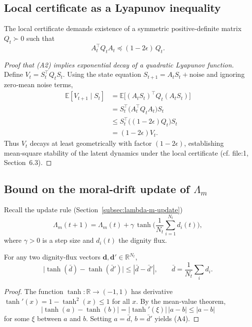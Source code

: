 \documentclass[11pt]{article}
\begin{document}
\subsection{Local certificate as a Lyapunov inequality}
The local certificate demands existence of a symmetric positive‑definite matrix $Q_t\succ0$ such that
\[
A_t^\top Q_t A_t \preceq (1-2\epsilon)\,Q_t .
\tag{A2}
\]

\begin{proof}[Proof that (A2) implies exponential decay of a quadratic Lyapunov function]
Define $V_t = S_t^\top Q_t S_t$. Using the state equation $S_{t+1}=A_t S_t+\text{noise}$ and ignoring zero‑mean noise terms,
\begin{align*}
\mathbb{E}[V_{t+1}\mid S_t]
   &= \mathbb{E}\big[(A_t S_t)^\top Q_t (A_t S_t)\big]   \\
   &= S_t^\top \big(A_t^\top Q_t A_t\big) S_t            \\
   &\le S_t^\top \big((1-2\epsilon)Q_t\big) S_t          \\
   &= (1-2\epsilon) V_t .
\end{align*}
Thus $V_t$ decays at least geometrically with factor $(1-2\epsilon)$, establishing mean‑square stability of the latent dynamics under the local certificate (cf. file:1, Section~6.3).
\end{proof}

\subsection{Bound on the moral‑drift update of $\Lambda_m$}
Recall the update rule (Section~\ref{subsec:lambda-m-update})
\[
\Lambda_m(t+1)=\Lambda_m(t)+\gamma\,\tanh\!\Big(\frac{1}{N_t}\sum_{i=1}^{N_t} d_i(t)\Big),
\tag{A3}
\]
where $\gamma>0$ is a step size and $d_i(t)$ the dignity flux.

\begin{lemma}
For any two dignity‑flux vectors $\mathbf{d},\mathbf{d}'\in\mathbb{R}^{N_t}$,
\[
\big|\tanh(\bar{d})-\tanh(\bar{d}')\big|
\le |\bar{d}-\bar{d}'| ,
\qquad
\bar{d}=\frac{1}{N_t}\sum_i d_i .
\tag{A4}
\]
\end{lemma}

\begin{proof}
The function $\tanh:\mathbb{R}\to(-1,1)$ has derivative $\tanh'(x)=1-\tanh^2(x)\le1$ for all $x$. By the mean‑value theorem,
\[
|\tanh(a)-\tanh(b)|
=| \tanh'(\xi) |\,|a-b|
\le |a-b|
\]
for some $\xi$ between $a$ and $b$. Setting $a=\bar{d}$, $b=\bar{d}'$ yields (A4).
\end{proof}
\end{document}
